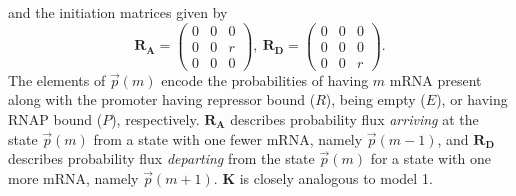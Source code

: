 and the initiation matrices given by
\begin{equation}
\mathbf{R_A} = \begin{pmatrix}
                0 & 0 & 0 \\ 
                0 & 0 & r \\ 
                0 & 0 & 0
                \end{pmatrix},\
\mathbf{R_D} = \begin{pmatrix}
                0 & 0 & 0 \\ 
                0 & 0 & 0 \\ 
                0 & 0 & r
                \end{pmatrix}.
\label{eq:3state_cme_matrices_pt2}
\end{equation}
The elements of $\vec{p}(m)$ encode the probabilities of having $m$ mRNA present
along with the promoter having repressor bound ($R$), being empty ($E$), or
having RNAP bound ($P$), respectively. $\mathbf{R_A}$ describes probability flux
\textit{arriving} at the state $\vec{p}(m)$ from a state with one fewer mRNA,
namely $\vec{p}(m-1)$, and $\mathbf{R_D}$ describes probability flux
\textit{departing} from the state $\vec{p}(m)$ for a state with one more mRNA,
namely $\vec{p}(m+1)$. $\mathbf{K}$ is closely analogous to model 1.



